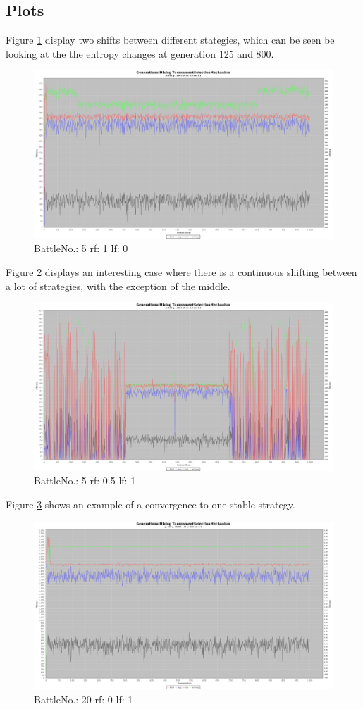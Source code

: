 \subsection{Plots}
	Figure \ref{fig:510} display two shifts between different stategies, which can be seen be looking at the the entropy changes at generation 125 and 800. 
	\begin{figure}[H]%
	\includegraphics[width=\columnwidth]{b/5/d510.png}%
	\caption{BattleNo.: 5 rf: 1 lf: 0}%
	\label{fig:510}%
	\end{figure}
	Figure \ref{fig:5x1} displays an interesting case where there is a continuous shifting between a lot of strategies, with the exception of the middle. 
	\begin{figure}[H]%
	\includegraphics[width=\columnwidth]{b/5/h5x1.png}%
	\caption{BattleNo.: 5 rf: 0.5 lf: 1}%
	\label{fig:5x1}%
	\end{figure}
	Figure \ref{fig:201} shows an example of a convergence to one stable strategy. 
	\begin{figure}[H]%
	\includegraphics[width=\columnwidth]{b/20/b201.png}%
	\caption{BattleNo.: 20 rf: 0 lf: 1}%
	\label{fig:201}%
	\end{figure}
